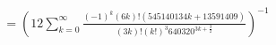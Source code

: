 \documentclass[preview]{standalone}
\begin{document}
\begin{align*}
= \left(12 \sum_{k=0}^{\infty} \frac{(-1)^k (6k)! (545140134k + 13591409)}{(3k)!(k!)^3 640320^{3k + \frac{3}{2}}}\right)^{-1}
\end{align*}
\end{document}

